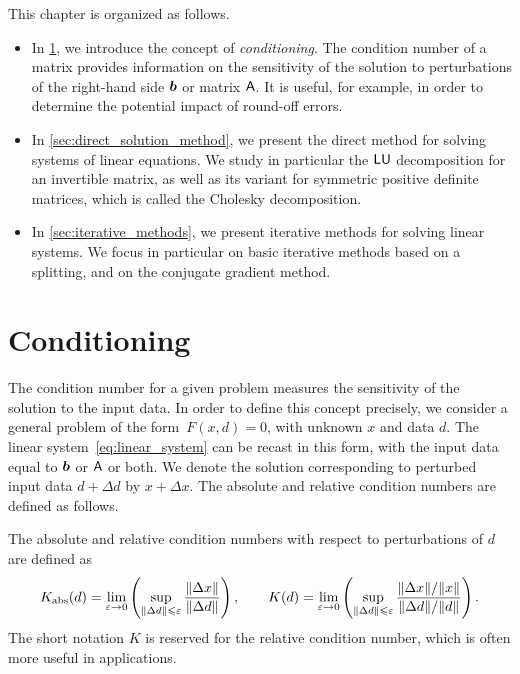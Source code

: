 This chapter is organized as follows.
\begin{itemize}
    \item
        In \cref{sec:conditioning},
        we introduce the concept of \emph{conditioning}.
        The condition number of a matrix provides information on the sensitivity of the solution to perturbations of the right-hand side $\mathbf{\boldsymbol{b}}$ or matrix $\mathsf A$.
        It is useful, for example, in order to determine the potential impact of round-off errors.

    \item
        In \cref{sec:direct_solution_method},
        we present the direct method for solving systems of linear equations.
        We study in particular the $\mathsf L \mathsf U$ decomposition for an invertible matrix,
        as well as its variant for symmetric positive definite matrices,
        which is called the Cholesky decomposition.

    \item
        In \cref{sec:iterative_methods},
        we present iterative methods for solving linear systems.
        We focus in particular on basic iterative methods based on a splitting,
        and on the conjugate gradient method.
\end{itemize}

\section{Conditioning}%
\label{sec:conditioning}

The condition number for a given problem measures the sensitivity of the solution to the input data.
In order to define this concept precisely,
we consider a general problem of the form~$F(x, d) = 0$,
with unknown $x$ and data $d$.
The linear system~\eqref{eq:linear_system} can be recast in this form,
with the input data equal to $\mathbf{\boldsymbol{b}}$ or $\mathsf A$ or both.
We denote the solution corresponding to perturbed input data $d + \Delta d$ by $x + \Delta x$.
The absolute and relative condition numbers are defined as follows.

\begin{definition}
    [Condition number for the problem $F(x, d) = 0$]
    The absolute and relative condition numbers with respect to perturbations of $d$ are defined as
    \[
        K_{\rm abs}(d) = \lim_{\varepsilon \to 0} \left( \sup_{\lVert\Delta d\rVert \leqslant \varepsilon} \frac{\lVert\Delta x\rVert}{\lVert\Delta d\rVert} \right),
        \qquad
        K(d) = \lim_{\varepsilon \to 0} \left( \sup_{\lVert\Delta d\rVert \leqslant \varepsilon} \frac{\lVert\Delta x\rVert / \lVert x\rVert}{\lVert\Delta d\rVert / \lVert d\rVert} \right).
    \]
    The short notation $K$ is reserved for the relative condition number,
    which is often more useful in applications.
\end{definition}

